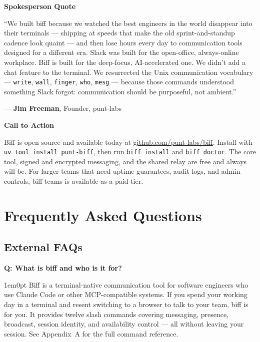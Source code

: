 \documentclass[11pt,letterpaper]{article}
\newcommand{\prsection}[1]{%
  \vspace{1em}%
  {\large\bfseries\color{SectionBlue}#1}%
  \vspace{0.3em}\par%
}
\newcounter{faqnum}
\newenvironment{faqpair}[1]{%
  \needspace{4\baselineskip}%
  \vspace{0.5em}%
  \refstepcounter{faqnum}%
  \noindent\textbf{\color{SectionBlue}Q\thefaqnum: #1}\par\nopagebreak[4]%
  \vspace{0.2em}%
  \begin{adjustwidth}{1em}{0pt}%
  \setlength{\parindent}{0pt}%
}{%
  \end{adjustwidth}%
  \vspace{0.5em}%
}
\begin{document}
\prsection{Spokesperson Quote}

\begin{spokespersonquote}
``We built biff because we watched the best engineers in the world
disappear into their terminals --- shipping at speeds that make the old
sprint-and-standup cadence look quaint --- and then lose hours every day to
communication tools designed for a different era. Slack was built for the
open-office, always-online workplace. Biff is built for the deep-focus,
AI-accelerated one. We didn't add a chat feature to the terminal. We
resurrected the Unix communication vocabulary --- \texttt{write},
\texttt{wall}, \texttt{finger}, \texttt{who}, \texttt{mesg} --- because
those commands understood something Slack forgot: communication should be
purposeful, not ambient.''

\raggedleft --- \textbf{Jim Freeman}, Founder, punt-labs
\end{spokespersonquote}

\prsection{Call to Action}

Biff is open source and available today at
\href{https://github.com/punt-labs/biff}{github.com/punt-labs/biff}.
Install with \texttt{uv tool install punt-biff}, then run \texttt{biff install}
and \texttt{biff doctor}. The core tool, signed and encrypted messaging, and the
shared relay are free and always will be. For larger teams that need uptime
guarantees, audit logs, and admin controls, biff teams is available as a
paid tier.

\newpage


\section*{Frequently Asked Questions}


\subsection*{External FAQs}

\begin{faqpair}{What is biff and who is it for?}\label{faq:what-is-biff}
  Biff is a terminal-native communication tool for software engineers who
  use Claude Code or other MCP-compatible systems. If you spend your working
  day in a terminal and resent switching to a browser to talk to your team,
  biff is for you. It provides twelve slash commands covering messaging,
  presence, broadcast, session identity, and availability control --- all without
  leaving your session. See Appendix~A for the full command reference.
\end{faqpair}
\end{document}
